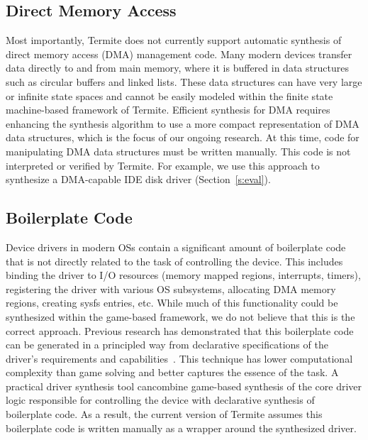 \documentclass{book}
\newcommand{\termite}{Termite\xspace}
\theoremstyle{definition}
\begin{document}

\subsection{Direct Memory Access}

Most importantly, \termite does not currently support automatic synthesis of direct memory access (DMA) management code.  Many modern devices transfer data directly to and from main memory, where it is buffered in data structures such as circular buffers and linked lists.  These data structures can have very large or infinite state spaces and cannot be easily modeled within the finite state machine-based framework of \termite.  Efficient synthesis for DMA requires enhancing the synthesis algorithm to use a more compact representation of DMA data structures, which is the focus of our ongoing research.  At this time, code for manipulating DMA data structures must be written manually.  This code is not interpreted or verified by \termite.  For example, we use this approach to synthesize a DMA-capable IDE disk driver (Section~\ref{s:eval}).

\subsection{Boilerplate Code}

Device drivers in modern OSs contain a significant amount of boilerplate code that is not directly related to the task of controlling the device.  This includes binding the driver to I/O resources (memory mapped regions, interrupts, timers), registering the driver with various OS subsystems, allocating DMA memory regions, creating sysfs entries, etc.  While much of this functionality could be synthesized within the game-based framework, we do not believe that this is the correct approach.  Previous research has demonstrated that this boilerplate code can be generated in a principled way from declarative specifications of the driver's requirements and capabilities~\cite{Spear_RHHL_06}.  This technique has lower computational complexity than game solving and better captures the essence of the task.  A practical driver synthesis tool cancombine game-based synthesis of the core driver logic responsible for controlling the device with declarative synthesis of boilerplate code.  As a result, the current version of \termite assumes this boilerplate code is written manually as a wrapper around the synthesized driver.
\end{document}
